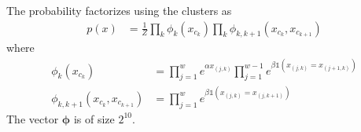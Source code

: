 \documentclass[11pt]{article}
\newcommand{\bmphi}{\boldsymbol{\phi}}
\begin{document}
The probability factorizes using the clusters as
\begin{align*}
	p(x) &= \frac{1}{Z}\prod_k
	\phi_k(x_{c_k})
	\prod_k
	\phi_{k,k+1}(x_{c_k},x_{c_{k+1}})
\end{align*}
where 
\begin{align*}
	\phi_k(x_{c_k}) &= \prod_{j=1}^w e^{\alpha x_{(j,k)}}
	\prod_{j=1}^{w-1} e^{
		\beta \mathds{1}(
			x_{(j,k)}=x_{(j+1,k)}
		)
	}  \\
	\phi_{k,k+1}(x_{c_k}, x_{c_{k+1}}) &=
	\prod_{j=1}^w e^{
		\beta \mathds{1}(
			x_{(j,k)}=x_{(j,k+1)}
		)
	}
\end{align*}
The vector $\bmphi$ is of size $2^{10}$.
\end{document}
